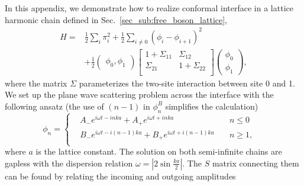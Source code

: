 
In this appendix, we demonstrate how to realize conformal interface in a lattice harmonic chain defined in Sec.~\ref{sec_sub:free_boson_lattice},
\begin{equation}
\begin{aligned}
H =& \frac{1}{2} \sum_i \pi_i^2  +  \frac{1}{2} \sum_{i\ne 0 }  ( \phi_i - \phi_{i+1} )^2  \\
 &+ \frac{1}{2} \begin{pmatrix}  \phi_0, \phi_1 \end{pmatrix}
\begin{bmatrix}
1 + \Sigma_{11}  & \Sigma_{12} \\
\Sigma_{21} &  1 + \Sigma_{22} \\
\end{bmatrix}
\begin{pmatrix}
  \phi_0 \\
  \phi_1 
\end{pmatrix},
\end{aligned}
\end{equation}
where the matrix $\Sigma$ parameterizes the two-site interaction between site 0 and 1. We set up the plane wave scattering problem across the interface with the following ansatz (the use of $(n-1)$ in $\phi_n^B$ simplifies the calculation)
\begin{equation}
\label{eq:ansatz}
\phi_n
= \left\lbrace
  \begin{aligned}
	& A_{-} e^{i \omega t  - inka}  + A_{+} e^{i \omega t  + inka}  & \quad  n \le 0 \\
	& B_{-} e^{i \omega t  - i(n-1)ka}  + B_{+} e^{i \omega t  + i(n-1)ka} & \quad n \ge 1 ,\\
  \end{aligned} \right. 
 \quad 
\end{equation}
where $a$ is the lattice constant. The solution on both semi-infinite chains are gapless with the dispersion relation $\omega = \left|2\sin\frac{ka}{2}\right|$. The $S$ matrix connecting them can be found by relating the incoming and outgoing amplitudes
